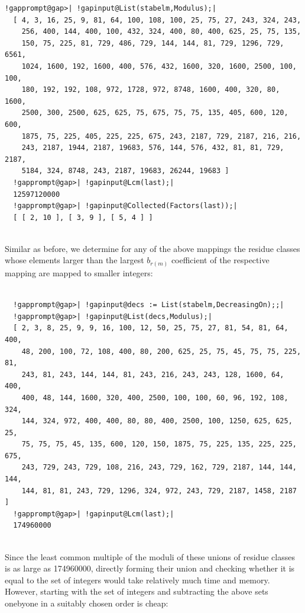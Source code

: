 \documentclass[a4paper,11pt]{report}
\begin{document}
{{\begin{Verbatim}[commandchars=!@|,fontsize=\small,frame=single,label=Example]
  !gapprompt@gap>| !gapinput@List(stabelm,Modulus);|
  [ 4, 3, 16, 25, 9, 81, 64, 100, 108, 100, 25, 75, 27, 243, 324, 243, 
    256, 400, 144, 400, 100, 432, 324, 400, 80, 400, 625, 25, 75, 135, 
    150, 75, 225, 81, 729, 486, 729, 144, 144, 81, 729, 1296, 729, 6561, 
    1024, 1600, 192, 1600, 400, 576, 432, 1600, 320, 1600, 2500, 100, 100, 
    180, 192, 192, 108, 972, 1728, 972, 8748, 1600, 400, 320, 80, 1600, 
    2500, 300, 2500, 625, 625, 75, 675, 75, 75, 135, 405, 600, 120, 600, 
    1875, 75, 225, 405, 225, 225, 675, 243, 2187, 729, 2187, 216, 216, 
    243, 2187, 1944, 2187, 19683, 576, 144, 576, 432, 81, 81, 729, 2187, 
    5184, 324, 8748, 243, 2187, 19683, 26244, 19683 ]
  !gapprompt@gap>| !gapinput@Lcm(last);|
  12597120000
  !gapprompt@gap>| !gapinput@Collected(Factors(last));|
  [ [ 2, 10 ], [ 3, 9 ], [ 5, 4 ] ]
  
\end{Verbatim}
 Similar as before, we determine for any of the above mappings the residue
classes whose elements larger than the largest $b_{r(m)}$ \texttt{} coefficient of the respective mapping are mapped to
smaller integers: 
\begin{Verbatim}[commandchars=!@|,fontsize=\small,frame=single,label=Example]
  
  !gapprompt@gap>| !gapinput@decs := List(stabelm,DecreasingOn);;|
  !gapprompt@gap>| !gapinput@List(decs,Modulus);|
  [ 2, 3, 8, 25, 9, 9, 16, 100, 12, 50, 25, 75, 27, 81, 54, 81, 64, 400, 
    48, 200, 100, 72, 108, 400, 80, 200, 625, 25, 75, 45, 75, 75, 225, 81, 
    243, 81, 243, 144, 144, 81, 243, 216, 243, 243, 128, 1600, 64, 400, 
    400, 48, 144, 1600, 320, 400, 2500, 100, 100, 60, 96, 192, 108, 324, 
    144, 324, 972, 400, 400, 80, 80, 400, 2500, 100, 1250, 625, 625, 25, 
    75, 75, 75, 45, 135, 600, 120, 150, 1875, 75, 225, 135, 225, 225, 675, 
    243, 729, 243, 729, 108, 216, 243, 729, 162, 729, 2187, 144, 144, 144, 
    144, 81, 81, 243, 729, 1296, 324, 972, 243, 729, 2187, 1458, 2187 ]
  !gapprompt@gap>| !gapinput@Lcm(last);|
  174960000
  
\end{Verbatim}
 Since the least common multiple of the moduli of these unions of residue
classes is as large as 174960000, directly forming their union and checking
whether it is equal to the set of integers would take relatively much time and
memory. However, starting with the set of integers and subtracting the above
sets one\texttt{}by\texttt{}one in a suitably chosen
order is cheap: 
\begin{Verbatim}[commandchars=!@|,fontsize=\small,frame=single,label=Example]
  

\end{Verbatim}}}
\end{document}
